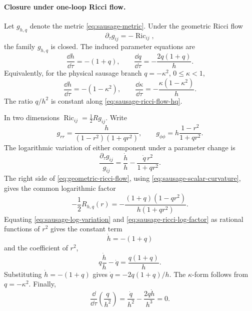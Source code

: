 \paragraph{Closure under one-loop Ricci flow.}
Let \(g_{h,q}\) denote the metric \eqref{eq:sausage-metric}.  Under the
geometric Ricci flow
\begin{equation}
  \partial_\tau g_{ij}=-\operatorname{Ric}_{ij},
  \label{eq:geometric-ricci-flow}
\end{equation}
the family \(g_{h,q}\) is closed.  The induced parameter equations are
\begin{equation}
  \frac{\dd h}{\dd\tau}=-(1+q),
  \qquad
  \frac{\dd q}{\dd\tau}=-\frac{2q(1+q)}{h}.
  \label{eq:sausage-ricci-flow-hq}
\end{equation}
Equivalently, for the physical sausage branch \(q=-\kappa^2\), \(0\le\kappa<1\),
\begin{equation}
  \frac{\dd h}{\dd\tau}=-(1-\kappa^2),
  \qquad
  \frac{\dd\kappa}{\dd\tau}=-\frac{\kappa(1-\kappa^2)}{h}.
  \label{eq:sausage-ricci-flow-kappa}
\end{equation}
The ratio \(q/h^2\) is constant along \eqref{eq:sausage-ricci-flow-hq}.

In two dimensions \(\operatorname{Ric}_{ij}=\frac12 R g_{ij}\).  Write
\[
  g_{rr}=\frac{h}{(1-r^2)(1+qr^2)},
  \qquad
  g_{\phi\phi}=h\frac{1-r^2}{1+qr^2}.
\]
The logarithmic variation of either component under a parameter change is
\begin{equation}
  \frac{\partial_\tau g_{ij}}{g_{ij}}
  =
  \frac{\dot h}{h}-\frac{\dot q\,r^2}{1+qr^2}.
  \label{eq:sausage-log-variation}
\end{equation}
The right side of \eqref{eq:geometric-ricci-flow}, using
\eqref{eq:sausage-scalar-curvature}, gives the common logarithmic factor
\begin{equation}
  -\frac12 R_{h,q}(r)
  =
  -\frac{(1+q)(1-qr^2)}{h(1+qr^2)}.
  \label{eq:sausage-ricci-log-factor}
\end{equation}
Equating \eqref{eq:sausage-log-variation} and
\eqref{eq:sausage-ricci-log-factor} as rational functions of \(r^2\) gives
the constant term
\[
  \dot h=-(1+q)
\]
and the coefficient of \(r^2\),
\[
  q\frac{\dot h}{h}-\dot q=\frac{q(1+q)}{h}.
\]
Substituting \(\dot h=-(1+q)\) gives
\(\dot q=-2q(1+q)/h\).  The \(\kappa\)-form follows from
\(q=-\kappa^2\).  Finally,
\[
  \frac{\dd}{\dd\tau}\left(\frac q{h^2}\right)
  =
  \frac{\dot q}{h^2}-\frac{2q\dot h}{h^3}=0.
\]

